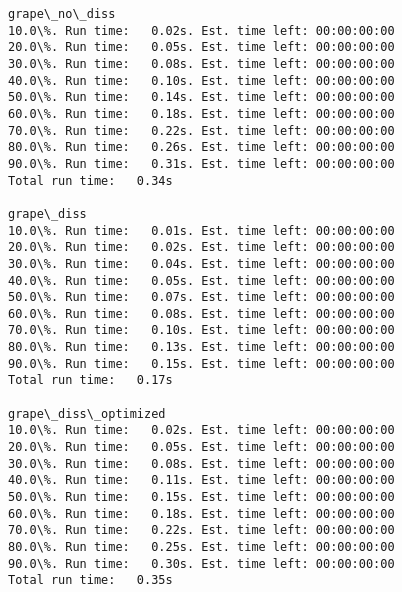 \documentclass[11pt]{article}
\begin{document}
    \begin{Verbatim}[commandchars=\\\{\}]
grape\_no\_diss
10.0\%. Run time:   0.02s. Est. time left: 00:00:00:00
20.0\%. Run time:   0.05s. Est. time left: 00:00:00:00
30.0\%. Run time:   0.08s. Est. time left: 00:00:00:00
40.0\%. Run time:   0.10s. Est. time left: 00:00:00:00
50.0\%. Run time:   0.14s. Est. time left: 00:00:00:00
60.0\%. Run time:   0.18s. Est. time left: 00:00:00:00
70.0\%. Run time:   0.22s. Est. time left: 00:00:00:00
80.0\%. Run time:   0.26s. Est. time left: 00:00:00:00
90.0\%. Run time:   0.31s. Est. time left: 00:00:00:00
Total run time:   0.34s

grape\_diss
10.0\%. Run time:   0.01s. Est. time left: 00:00:00:00
20.0\%. Run time:   0.02s. Est. time left: 00:00:00:00
30.0\%. Run time:   0.04s. Est. time left: 00:00:00:00
40.0\%. Run time:   0.05s. Est. time left: 00:00:00:00
50.0\%. Run time:   0.07s. Est. time left: 00:00:00:00
60.0\%. Run time:   0.08s. Est. time left: 00:00:00:00
70.0\%. Run time:   0.10s. Est. time left: 00:00:00:00
80.0\%. Run time:   0.13s. Est. time left: 00:00:00:00
90.0\%. Run time:   0.15s. Est. time left: 00:00:00:00
Total run time:   0.17s

grape\_diss\_optimized
10.0\%. Run time:   0.02s. Est. time left: 00:00:00:00
20.0\%. Run time:   0.05s. Est. time left: 00:00:00:00
30.0\%. Run time:   0.08s. Est. time left: 00:00:00:00
40.0\%. Run time:   0.11s. Est. time left: 00:00:00:00
50.0\%. Run time:   0.15s. Est. time left: 00:00:00:00
60.0\%. Run time:   0.18s. Est. time left: 00:00:00:00
70.0\%. Run time:   0.22s. Est. time left: 00:00:00:00
80.0\%. Run time:   0.25s. Est. time left: 00:00:00:00
90.0\%. Run time:   0.30s. Est. time left: 00:00:00:00
Total run time:   0.35s



    \end{Verbatim}
\end{document}
